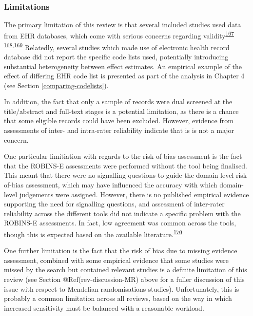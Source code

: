 \documentclass[a4paper, twoside]{templates/ociamthesis}
\begin{document}
~

\hypertarget{limitations}{%
\subsubsection{Limitations}\label{limitations}}

The primary limitation of this review is that several included studies used data from EHR databases, which come with serious concerns regarding validity\textsuperscript{\protect\hyperlink{ref-hsieh2019}{167}} \textsuperscript{\protect\hyperlink{ref-mcguinness2019validity}{168},\protect\hyperlink{ref-wilkinson2018}{169}} Relatedly, several studies which made use of electronic health record database did not report the specific code lists used, potentially introducing substantial heterogeneity between effect estimates. An empirical example of the effect of differing EHR code list is presented as part of the analysis in Chapter 4 (see Section \ref{comparing-codelists}).

In addition, the fact that only a sample of records were dual screened at the title/abstract and full-text stages is a potential limitation, as there is a chance that some eligible records could have been excluded. However, evidence from assessments of inter- and intra-rater reliability indicate that is is not a major concern.

One particular limitiation with regards to the risk-of-bias assessment is the fact that the ROBINS-E assessments were performed without the tool being finalised. This meant that there were no signalling questions to guide the domain-level risk-of-bias assessment, which may have influenced the accuracy with which domain-level judgements were assigned. However, there is no published empirical evidence supporting the need for signalling questions, and assessment of inter-rater reliability across the different tools did not indicate a specific problem with the ROBINS-E assessments. In fact, low agreement was common across the tools, though this is expected based on the available literature.\textsuperscript{\protect\hyperlink{ref-jeyaraman2020}{170}}

One further limitation is the fact that the risk of bias due to missing evidence assessment, combined with some empirical evidence that some studies were missed by the search but contained relevant studies is a definite limitation of this review (see Section @Ref(rev-discussion-MR) above for a fuller discussion of this issue with respect to Mendelian randomisations studies). Unfortunately, this is probably a common limitation across all reviews, based on the way in which increased sensitivity must be balanced with a reasonable workload.
\end{document}
